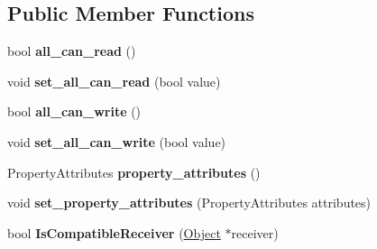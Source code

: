 \subsection*{Public Member Functions}
\begin{DoxyCompactItemize}
\item 
\hypertarget{classv8_1_1internal_1_1_accessor_info_a15ee717df70fd30880f5a3e15a90b02a}{}bool {\bfseries all\+\_\+can\+\_\+read} ()\label{classv8_1_1internal_1_1_accessor_info_a15ee717df70fd30880f5a3e15a90b02a}

\item 
\hypertarget{classv8_1_1internal_1_1_accessor_info_afc007f500afa962d19ef75d52de03c89}{}void {\bfseries set\+\_\+all\+\_\+can\+\_\+read} (bool value)\label{classv8_1_1internal_1_1_accessor_info_afc007f500afa962d19ef75d52de03c89}

\item 
\hypertarget{classv8_1_1internal_1_1_accessor_info_acb963c18a2b77d7b79ebca64b8192a12}{}bool {\bfseries all\+\_\+can\+\_\+write} ()\label{classv8_1_1internal_1_1_accessor_info_acb963c18a2b77d7b79ebca64b8192a12}

\item 
\hypertarget{classv8_1_1internal_1_1_accessor_info_a7845e45a30b59305f606d8b3dbbabb13}{}void {\bfseries set\+\_\+all\+\_\+can\+\_\+write} (bool value)\label{classv8_1_1internal_1_1_accessor_info_a7845e45a30b59305f606d8b3dbbabb13}

\item 
\hypertarget{classv8_1_1internal_1_1_accessor_info_a13c8eb4416eee0482ef82e32c7df4ea6}{}Property\+Attributes {\bfseries property\+\_\+attributes} ()\label{classv8_1_1internal_1_1_accessor_info_a13c8eb4416eee0482ef82e32c7df4ea6}

\item 
\hypertarget{classv8_1_1internal_1_1_accessor_info_ad7d09993c5975f13a58aced7e1b482eb}{}void {\bfseries set\+\_\+property\+\_\+attributes} (Property\+Attributes attributes)\label{classv8_1_1internal_1_1_accessor_info_ad7d09993c5975f13a58aced7e1b482eb}

\item 
\hypertarget{classv8_1_1internal_1_1_accessor_info_af90ccc9b509016f749a5d69a29cebdf4}{}bool {\bfseries Is\+Compatible\+Receiver} (\hyperlink{classv8_1_1internal_1_1_object}{Object} $\ast$receiver)\label{classv8_1_1internal_1_1_accessor_info_af90ccc9b509016f749a5d69a29cebdf4}

\end{DoxyCompactItemize}
